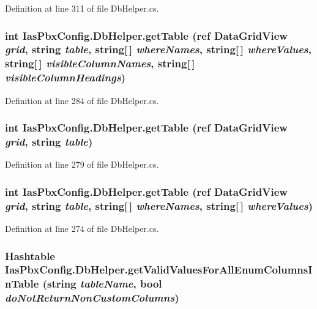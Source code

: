 Definition at line 311 of file DbHelper.cs.\hypertarget{class_ias_pbx_config_1_1_db_helper_a826d8d2c372759bf407b7da4b5633ff6}{
\subsubsection[{getTable}]{\setlength{\rightskip}{0pt plus 5cm}int IasPbxConfig.DbHelper.getTable (ref DataGridView {\em grid}, \/  string {\em table}, \/  string\mbox{[}$\,$\mbox{]} {\em whereNames}, \/  string\mbox{[}$\,$\mbox{]} {\em whereValues}, \/  string\mbox{[}$\,$\mbox{]} {\em visibleColumnNames}, \/  string\mbox{[}$\,$\mbox{]} {\em visibleColumnHeadings})}}
\label{class_ias_pbx_config_1_1_db_helper_a826d8d2c372759bf407b7da4b5633ff6}


Definition at line 284 of file DbHelper.cs.\hypertarget{class_ias_pbx_config_1_1_db_helper_ac404860e05ce2c60f03893c92ae51cef}{
\subsubsection[{getTable}]{\setlength{\rightskip}{0pt plus 5cm}int IasPbxConfig.DbHelper.getTable (ref DataGridView {\em grid}, \/  string {\em table})}}
\label{class_ias_pbx_config_1_1_db_helper_ac404860e05ce2c60f03893c92ae51cef}


Definition at line 279 of file DbHelper.cs.\hypertarget{class_ias_pbx_config_1_1_db_helper_ab796d249ab48e0f89248fd41891f1763}{
\subsubsection[{getTable}]{\setlength{\rightskip}{0pt plus 5cm}int IasPbxConfig.DbHelper.getTable (ref DataGridView {\em grid}, \/  string {\em table}, \/  string\mbox{[}$\,$\mbox{]} {\em whereNames}, \/  string\mbox{[}$\,$\mbox{]} {\em whereValues})}}
\label{class_ias_pbx_config_1_1_db_helper_ab796d249ab48e0f89248fd41891f1763}


Definition at line 274 of file DbHelper.cs.\hypertarget{class_ias_pbx_config_1_1_db_helper_a5f9ac6d60871e936168cc8c00ed2eb90}{
\subsubsection[{getValidValuesForAllEnumColumnsInTable}]{\setlength{\rightskip}{0pt plus 5cm}Hashtable IasPbxConfig.DbHelper.getValidValuesForAllEnumColumnsInTable (string {\em tableName}, \/  bool {\em doNotReturnNonCustomColumns})}}
\label{class_ias_pbx_config_1_1_db_helper_a5f9ac6d60871e936168cc8c00ed2eb90}


